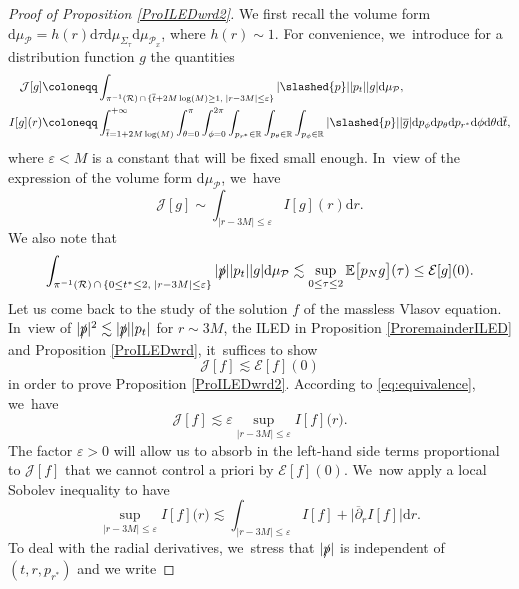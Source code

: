 \documentclass[10pt]{amsart}
\let\epsilon\varepsilon
\theoremstyle{plain}
\theoremstyle{definition}
\newcommand\R{{\mathbb{R}}}
\newcommand\dr{{\mathrm{d}}}
\begin{document}
\begin{proof}[Proof of Proposition \ref{ProILEDwrd2}]
We first recall the volume form $\dr \mu_{\mathcal{P}} =h(r) \dr \tau \dr \mu_{\Sigma_\tau} \dr \mu_{\mathcal{P}_x}$, where $h(r) \sim 1$. For convenience, we~introduce for a distribution function $g$ the quantities
\begin{align*}
\mathcal{J}[g]&\coloneqq \int_{\pi^{-1}(\mathcal{R})\,\cap \,\{ \overline{t}+2M\log(M) \geq 1, \; |r-3M| \leq \epsilon \} } |\slashed{p}||p_t||g| \dr \mu_{\mathcal{P}}, \\
I[g] (r)& \coloneqq \int_{\overline{t}=1+2M\log(M)}^{+ \infty} \int_{\theta=0}^\pi \int_{\phi =0}^{2\pi} \int_{p_{r^*} \in \R} \int_{p_\theta \in \R} \int_{p_\phi \in \R} |\slashed{p}||\overline{g}| \dr p_{\phi} \dr p_{\theta} \dr p_{r^*} \dr \phi \dr \theta \dr \overline{t},
\end{align*}
where $\epsilon <M$ is a constant that will be fixed small enough. In~view of the expression of the volume form $\dr \mu_{\mathcal{P}}$, we~have
\begin{equation}\label{eq:equivalence}
\mathcal{J}[g] \sim \int_{|r-3M|\leq \epsilon} I[g](r) \dr r.
\end{equation}
We also note that
\[
\int_{\pi^{-1}(\mathcal{R})\,\cap\, \{ 0 \leq t^* \leq 2, \; |r-3M| \leq \epsilon \} } |\slashed{p}||p_t||g| \dr \mu_{\mathcal{P}} \lesssim \sup_{0 \leq \tau \leq 2} \mathbb{E}\bigl[p_N g \bigr](\tau) \leq \mathcal{E}[g](0).
\]
Let us come back to the study of the solution $f$ of the massless Vlasov equation. In~view of $|\slashed{p}|^2 \lesssim |\slashed{p}||p_t|$ for $r \sim 3M$, the ILED in Proposition \ref{ProremainderILED} and Proposition \ref{ProILEDwrd}, it~suffices to show
\begin{equation}\label{eq:toprove}
\mathcal{J}[f] \lesssim \mathcal{E}[f](0)
\end{equation}
in order to prove Proposition \ref{ProILEDwrd2}. According to \eqref{eq:equivalence}, we~have
\begin{equation}\label{equa:auxi}
\mathcal{J}[f] \lesssim \epsilon \sup_{|r-3M| \leq \epsilon } I[f]\bigl(r\bigr).
\end{equation}
The factor $\epsilon>0$ will allow us to absorb in the left-hand side terms proportional to $\mathcal{J}[f]$ that we cannot control a priori by $\mathcal{E}[f](0)$. We~now apply a local Sobolev inequality to have
\[
\sup_{|r-3M| \leq \epsilon } I[f]\bigl(r\bigr) \lesssim \int_{|r-3M| \leq \epsilon } I[f] + \big| \overline{\partial}_r I[f] \big| \dr r.
\]
To deal with the radial derivatives, we~stress that $|\slashed{p}|$ is independent of $(t,r,p_{r^*})$ and we write

\end{proof}
\end{document}
